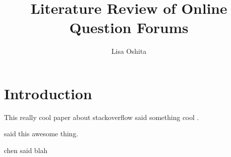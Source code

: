 \documentclass[12pt]{article}
\title{Literature Review of Online Question Forums}
\author{Lisa Oshita}
\date{}
\begin{document}
\maketitle

\section{Introduction}


This really cool paper about stackoverflow said something cool \citep{Ponzanelli2014a}.


\cite{Ponzanelli2014a} said this awesome thing.


chen said blah  \citep{Chen}



\end{document}
